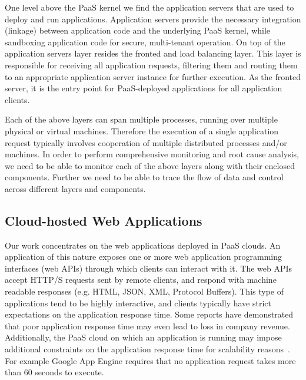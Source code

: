 One level above the PaaS kernel we find the application servers that are used to deploy and run
applications. Application servers provide the necessary integration (linkage) between application code and the
underlying PaaS kernel, while sandboxing application code for secure, multi-tenant operation. On top
of the application servers layer resides the fronted and load balancing layer. This layer is responsible
for receiving all application requests, filtering them and routing them to an appropriate application
server instance for further execution. As the fronted server, it is the entry point for PaaS-deployed
applications for all application clients.

Each of the above layers can span multiple processes, running over multiple physical or virtual
machines. Therefore the execution of a single application request typically involves cooperation
of multiple distributed processes and/or machines. In order to perform comprehensive monitoring
and root cause analysis, we need to be able to monitor each of the above layers along with their
enclosed components. Further we need to be able to trace the flow of data and control
across different layers and components.

\subsection{Cloud-hosted Web Applications} 


Our work concentrates on the web
applications deployed in PaaS clouds. An application of this nature exposes
one or more web application programming interfaces (web APIs) through which
clients can interact with it. The web APIs accept HTTP/S requests sent by
remote clients, and respond with machine readable responses (e.g. HTML, JSON,
XML, Protocol Buffers). This type of applications tend to be highly
interactive, and clients typically have strict expectations on the application
response time. Some reports have demonstrated that poor application response
time may even lead to loss in company revenue. Additionally, the PaaS cloud on
which an application is running may impose additional constraints on the
application response time for scalability
reasons~\cite{azure-limits,gae-limits}.  For example Google App Engine
requires that no application request takes more than 60 seconds to execute.

